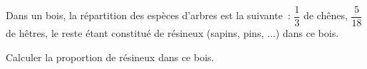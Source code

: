 \documentclass[exercice]{thedocument}%
\begin{document}
%
    Dans un bois, la répartition des espèces d'arbres est la suivante~: $\dfrac13$
    de chênes, $\dfrac5{18}$ de hêtres, le reste étant constitué de résineux
    (sapins, pins, ...) dans ce bois.\par\medskip\noindent
    Calculer la proportion de résineux dans ce bois.
\end{document}
